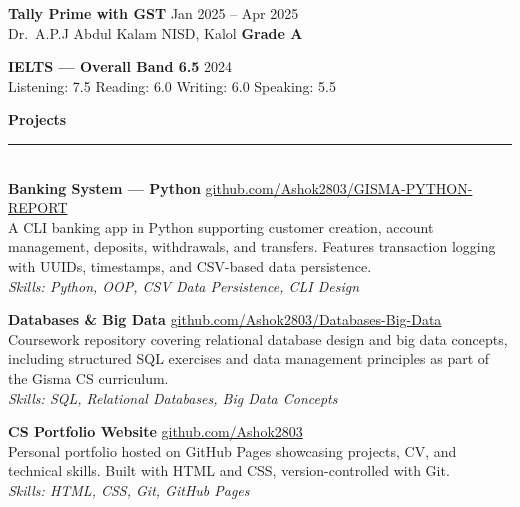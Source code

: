 \documentclass[a4paper,9pt]{article}
\newlength{\mainW}
\newcommand{\mainheading}[1]{%
  \vspace{6pt}%
  {\color{maincolor}\bfseries\normalsize #1}\\[-3pt]%
  {\color{maincolor}\rule{\linewidth}{1pt}}\\[3pt]%
}
\begin{document}
\begin{minipage}[t]{\mainW}
\begin{minipage}[t]{\mainW-0.8cm}
\vspace{4pt}

{\color{sidecolor}\bfseries\footnotesize Tally Prime with GST} \hfill {\scriptsize\color{maincolor} Jan 2025 -- Apr 2025}\\
{\color{textgray}\footnotesize Dr.\ A.P.J Abdul Kalam NISD, Kalol} \hfill {\scriptsize\color{accentcolor!70!black}\bfseries Grade A}

\vspace{4pt}

{\color{sidecolor}\bfseries\footnotesize IELTS --- Overall Band 6.5} \hfill {\scriptsize\color{maincolor} 2024}\\
{\color{textgray}\footnotesize Listening: 7.5 \quad Reading: 6.0 \quad Writing: 6.0 \quad Speaking: 5.5}

\mainheading{Projects}

{\color{sidecolor}\bfseries\footnotesize Banking System --- Python} \hfill {\scriptsize\color{maincolor} \href{https://github.com/Ashok2803/GISMA-PYTHON-REPORT}{github.com/Ashok2803/GISMA-PYTHON-REPORT}}\\
{\color{textgray}\footnotesize
A CLI banking app in Python supporting customer creation, account management, deposits, withdrawals, and transfers. Features transaction logging with UUIDs, timestamps, and CSV-based data persistence.
}\\
{\footnotesize\color{maincolor!70!black}\textit{Skills: Python, OOP, CSV Data Persistence, CLI Design}}

\vspace{5pt}

{\color{sidecolor}\bfseries\footnotesize Databases \& Big Data} \hfill {\scriptsize\color{maincolor} \href{https://github.com/Ashok2803/Databases-Big-Data}{github.com/Ashok2803/Databases-Big-Data}}\\
{\color{textgray}\footnotesize
Coursework repository covering relational database design and big data concepts, including structured SQL exercises and data management principles as part of the Gisma CS curriculum.
}\\
{\footnotesize\color{maincolor!70!black}\textit{Skills: SQL, Relational Databases, Big Data Concepts}}

\vspace{5pt}

{\color{sidecolor}\bfseries\footnotesize CS Portfolio Website} \hfill {\scriptsize\color{maincolor} \href{https://github.com/Ashok2803}{github.com/Ashok2803}}\\
{\color{textgray}\footnotesize
Personal portfolio hosted on GitHub Pages showcasing projects, CV, and technical skills. Built with HTML and CSS, version-controlled with Git.
}\\
{\footnotesize\color{maincolor!70!black}\textit{Skills: HTML, CSS, Git, GitHub Pages}}

\end{minipage}
\end{minipage}
\end{document}

